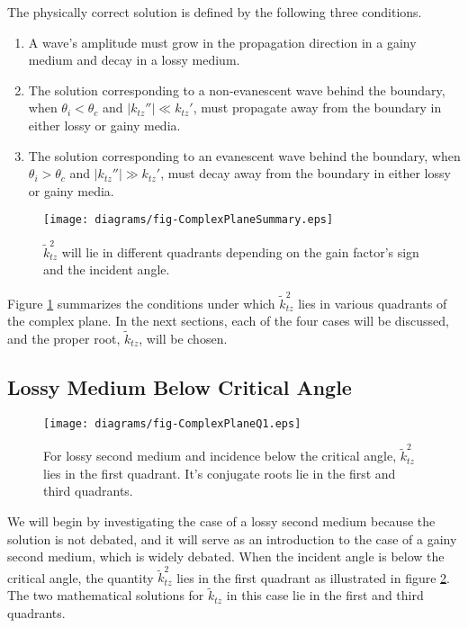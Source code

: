 \documentclass[12pt]{uthesis-v12}
\begin{document}
The physically correct solution is defined by the following three conditions.
\begin{enumerate}\label{conditions}
\item A wave's amplitude must grow in the propagation direction in a gainy medium and decay in a lossy medium.
\item The solution corresponding to a non-evanescent wave behind the boundary, when $\theta_i < \theta_c$ and $|k_{tz}''| \ll k_{tz}'$, must propagate away from the boundary in either lossy or gainy media.
\item The solution corresponding to an evanescent wave behind the boundary, when $\theta_i > \theta_c$ and $|k_{tz}''| \gg k_{tz}'$, must decay away from the boundary in either lossy or gainy media.
\end{enumerate}

\begin{figure}[htb]
\centering
  \texttt{[image: diagrams/fig-ComplexPlaneSummary.eps]}
\caption[Complex plane diagram for $\tilde{k}_{tz}^2$]{$\tilde{k}_{tz}^2$ will lie in different quadrants depending on the gain factor's sign and the incident angle.
 \label{fig-complexPlaneSummary}}
\end{figure}

Figure \ref{fig-complexPlaneSummary} summarizes the conditions under which $\tilde{k}^2_{tz}$ lies in various quadrants of the complex plane. In the next sections, each of the four cases will be discussed, and the proper root, $\tilde{k}_{tz}$, will be chosen.


\subsection{Lossy Medium Below Critical Angle}

\begin{figure}[ht]
\centering
  \texttt{[image: diagrams/fig-ComplexPlaneQ1.eps]}
\caption[$\tilde{k}_{tz}^2$ complex plane diagram, $\gamma<0$, $\theta_i<\theta_c$]{For lossy second medium and incidence below the critical angle, $\tilde{k}_{tz}^2$ lies in the first quadrant. It's conjugate roots lie in the first and third quadrants.
 \label{fig-complexQ1}}
\end{figure}

We will begin by investigating the case of a lossy second medium because the solution is not debated, and it will serve as an introduction to the case of a gainy second medium, which is widely debated.  When the incident angle is below the critical angle, the quantity $\tilde{k}_{tz}^2$ lies in the first quadrant as illustrated in figure \ref{fig-complexQ1}. The two mathematical solutions for $\tilde{k}_{tz}$ in this case lie in the first and third quadrants.
\end{document}
